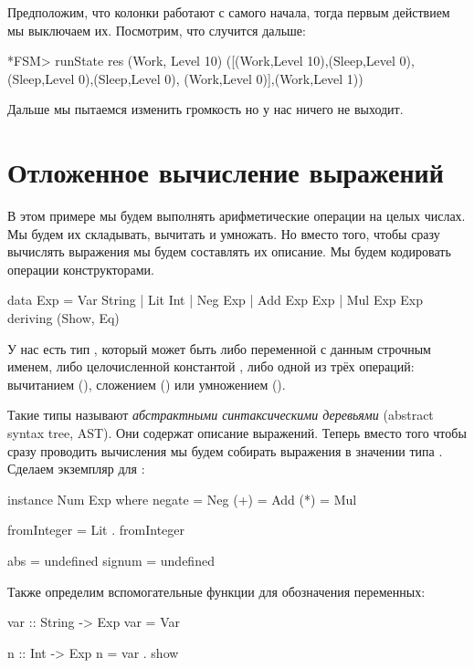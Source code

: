 Предположим, что колонки работают с самого начала, тогда
первым действием мы выключаем их. Посмотрим, что случится
дальше:

\begin{code}
*FSM> runState res (Work, Level 10)
([(Work,Level 10),(Sleep,Level 0),(Sleep,Level 0),(Sleep,Level 0),
 (Work,Level 0)],(Work,Level 1))
\end{code}

Дальше мы пытаемся изменить громкость но у нас ничего не выходит.

\section{Отложенное вычисление выражений}

В этом примере мы будем выполнять арифметические
операции на целых числах. Мы будем их складывать, вычитать и 
умножать. Но вместо того, чтобы сразу вычислять выражения
мы будем составлять их описание. Мы будем кодировать
операции конструкторами. 

\begin{code}
data Exp    = Var String
            | Lit Int
            | Neg Exp
            | Add Exp Exp
            | Mul Exp Exp
            deriving (Show, Eq)
\end{code}

У нас есть тип , который может быть либо переменной
 с данным строчным именем, либо целочисленной константой ,
либо одной из трёх операций: вычитанием (), сложением ()
или умножением ().

Такие типы называют \emph{абстрактными синтаксическими деревьями} 
(abstract syntax tree, AST). Они содержат описание выражений.
Теперь вместо того чтобы сразу проводить
вычисления мы будем собирать выражения в значении типа .
Сделаем экземпляр для :

\begin{code}
instance Num Exp where
    negate  = Neg
    (+)     = Add
    (*)     = Mul

    fromInteger = Lit . fromInteger

    abs     = undefined
    signum  = undefined
\end{code}

Также определим вспомогательные функции для обозначения
переменных: 

\begin{code}
var :: String -> Exp
var = Var

n :: Int -> Exp
n = var . show
\end{code}

